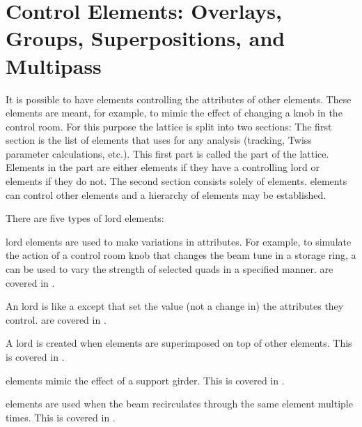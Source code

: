 \chapter[Overlays, Groups, Superpositions, and Multipass]
{Control Elements: Overlays, Groups, Superpositions, and Multipass}
\label{c:control}

It is possible to have elements controlling the attributes of other
elements. These  elements are meant, for example, to mimic
the effect of changing a knob in the control room. For this purpose
the lattice is split into two sections: The first section is the list
of elements that \bmad uses for any analysis (tracking, Twiss
parameter calculations, etc.). This first part is called the
 part of the lattice.
Elements in the  part are either
 elements if they have a controlling lord or 
elements if they do not.  The second section consists solely of
 elements.  elements can control other 
elements and a hierarchy of  elements may be established.

There are five types of lord elements: 
\begin{Itemize}
\item 
{}
 lord elements are used to make variations in
attributes. For example, to simulate the action of a control room knob
that changes the beam tune in a storage ring, a  can be used
to vary the strength of selected quads in a specified
manner.  are covered in .
\item
{}
An  lord is like a  except that 
set the value (not a change in) the attributes they
control.  are covered in .
\item
A  lord is created when elements are superimposed on
top of other elements. This is covered in .
\item
{}
 elements mimic the effect of a support girder. This is
covered in .
\item
{}
 elements are used when the beam recirculates through
the same element multiple times. This is covered in
.
\end{Itemize}

